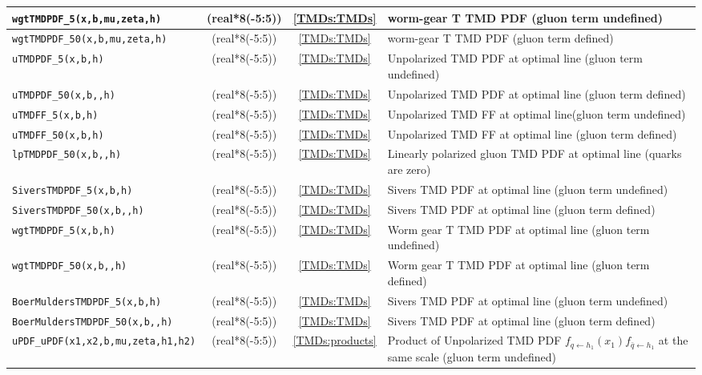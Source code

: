 \documentclass[prd,nofootinbib,eqsecnum,final]{revtex4}
\newcommand{\ot}{\leftarrow}
\renewcommand{\(}{\left(}
\renewcommand{\)}{\right)}
\renewcommand{\[}{\left[}
\renewcommand{\]}{\right]}
\begin{document}
\begin{center}
\begin{tabular}{||l|c|c|p{8cm}||}
\\\hline
\texttt{wgtTMDPDF{\_}5(x,b,mu,zeta,h)} & (real*8(-5:5)) &\ref{TMDs:TMDs} & worm-gear T TMD PDF (gluon term undefined)
\\\hline
\texttt{wgtTMDPDF{\_}50(x,b,mu,zeta,h)} & (real*8(-5:5)) &\ref{TMDs:TMDs} & worm-gear T TMD PDF (gluon term defined)
\\\hline\hline
\texttt{uTMDPDF{\_}5(x,b,h)} & (real*8(-5:5)) &\ref{TMDs:TMDs} & Unpolarized TMD PDF at optimal line (gluon term undefined)
\\\hline
\texttt{uTMDPDF{\_}50(x,b,,h)} & (real*8(-5:5)) &\ref{TMDs:TMDs} & Unpolarized TMD PDF at optimal line (gluon term defined)
\\\hline
\texttt{uTMDFF{\_}5(x,b,h)} & (real*8(-5:5)) &\ref{TMDs:TMDs} & Unpolarized TMD FF at optimal line(gluon term undefined)
\\\hline
\texttt{uTMDFF{\_}50(x,b,h)} & (real*8(-5:5)) &\ref{TMDs:TMDs} & Unpolarized TMD FF at optimal line (gluon term defined)
\\\hline
\texttt{lpTMDPDF{\_}50(x,b,,h)} & (real*8(-5:5)) &\ref{TMDs:TMDs} & Linearly polarized gluon TMD PDF at optimal line (quarks are zero)
\\\hline
\texttt{SiversTMDPDF{\_}5(x,b,h)} & (real*8(-5:5)) &\ref{TMDs:TMDs} & Sivers TMD PDF at optimal line (gluon term undefined)
\\\hline
\texttt{SiversTMDPDF{\_}50(x,b,,h)} & (real*8(-5:5)) &\ref{TMDs:TMDs} & Sivers TMD PDF at optimal line (gluon term defined)
\\\hline
\texttt{wgtTMDPDF{\_}5(x,b,h)} & (real*8(-5:5)) &\ref{TMDs:TMDs} & Worm gear T TMD PDF at optimal line (gluon term undefined)
\\\hline
\texttt{wgtTMDPDF{\_}50(x,b,,h)} & (real*8(-5:5)) &\ref{TMDs:TMDs} & Worm gear T TMD PDF at optimal line (gluon term defined)
\\\hline
\texttt{BoerMuldersTMDPDF{\_}5(x,b,h)} & (real*8(-5:5)) &\ref{TMDs:TMDs} & Sivers TMD PDF at optimal line (gluon term undefined)
\\\hline
\texttt{BoerMuldersTMDPDF{\_}50(x,b,,h)} & (real*8(-5:5)) &\ref{TMDs:TMDs} & Sivers TMD PDF at optimal line (gluon term defined)
\\\hline\hline
\texttt{uPDF{\_}uPDF(x1,x2,b,mu,zeta,h1,h2)} & (real*8(-5:5)) &\ref{TMDs:products} &  Product of Unpolarized TMD PDF $f_{q\ot h_1}(x_1)f_{\bar q\ot h_1}$ at the same scale (gluon term undefined)
\\
\hline\hline
\end{tabular}

\end{center}
\end{document}
